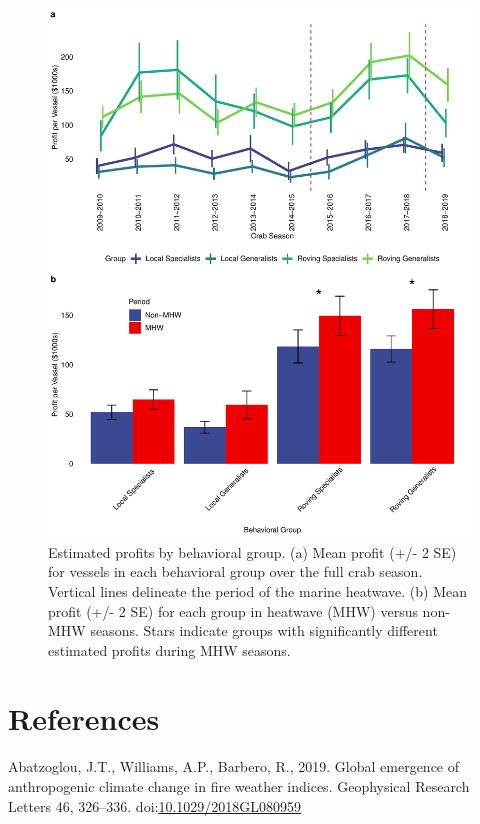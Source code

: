 \documentclass[]{elsarticle} %
\begin{document}
\begin{figure}%
\includegraphics [width=\linewidth]{fig_profits.pdf}
\caption{Estimated profits by behavioral group. (a) Mean profit (+/- 2 SE) for vessels in each behavioral group over the full crab season. Vertical lines delineate the period of the marine heatwave. (b) Mean profit (+/- 2 SE) for each group in heatwave (MHW) versus non-MHW seasons. Stars indicate groups with significantly different estimated profits during MHW seasons.}
\label{fig:profits}
\end{figure}

\hypertarget{refs}{%
\section*{References}\label{refs}}

\hypertarget{refs}{}
\leavevmode\hypertarget{ref-Abatzoglou2019}{}%
Abatzoglou, J.T., Williams, A.P., Barbero, R., 2019. Global emergence of
anthropogenic climate change in fire weather indices. Geophysical
Research Letters 46, 326--336.
doi:\href{https://doi.org/10.1029/2018GL080959}{10.1029/2018GL080959}
\end{document}
